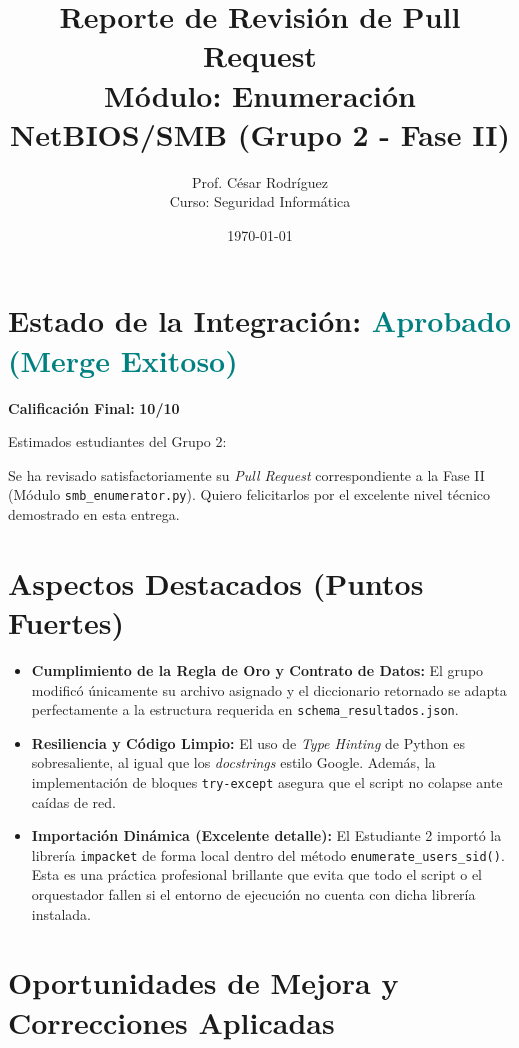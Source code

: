 \documentclass[12pt,a4paper]{article}
\title{Reporte de Revisión de Pull Request \\ \large Módulo: Enumeración NetBIOS/SMB (Grupo 2 - Fase II)}
\author{Prof. César Rodríguez \\ \small Curso: Seguridad Informática}
\date{\today}
\begin{document}
\maketitle

\section*{Estado de la Integración: \textcolor{teal}{Aprobado (Merge Exitoso)}}

\noindent \textbf{Calificación Final:} \textbf{10/10}

\vspace{0.5cm}
Estimados estudiantes del Grupo 2:

Se ha revisado satisfactoriamente su \textit{Pull Request} correspondiente a la Fase II (Módulo \texttt{smb\_enumerator.py}). Quiero felicitarlos por el excelente nivel técnico demostrado en esta entrega.

\section*{Aspectos Destacados (Puntos Fuertes)}

\begin{itemize}[label=$\bullet$]
    \item \textbf{Cumplimiento de la Regla de Oro y Contrato de Datos:} El grupo modificó únicamente su archivo asignado y el diccionario retornado se adapta perfectamente a la estructura requerida en \texttt{schema\_resultados.json}.
    \item \textbf{Resiliencia y Código Limpio:} El uso de \textit{Type Hinting} de Python es sobresaliente, al igual que los \textit{docstrings} estilo Google. Además, la implementación de bloques \texttt{try-except} asegura que el script no colapse ante caídas de red.
    \item \textbf{Importación Dinámica (Excelente detalle):} El Estudiante 2 importó la librería \texttt{impacket} de forma local dentro del método \texttt{enumerate\_users\_sid()}. Esta es una práctica profesional brillante que evita que todo el script o el orquestador fallen si el entorno de ejecución no cuenta con dicha librería instalada.
\end{itemize}

\section*{Oportunidades de Mejora y Correcciones Aplicadas}
\end{document}
